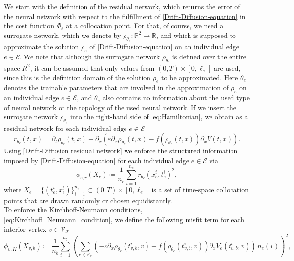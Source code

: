 We start with the definition of the residual network, which returns the error of the neural network with respect to the fulfillment of \cref{Drift-Diffusion-equation} in the cost function $\Phi_\theta$ at a collocation point. For that, of course, we need a surrogate network, which we denote by $\rho_{\theta_e} \colon \mathbb{R}^2 \to \mathbb{R}$, and which is supposed to approximate the solution $\rho_e$ of \cref{Drift-Diffusion-equation} on an individual edge $e \in \mathcal{E}$. We note that although the surrogate network $\rho_{\theta_e}$ is defined over the entire space $R^2$, it can be assumed that only values from $\left( 0, T \right) \times [0, \ell_e]$ are used, since this is the definition domain of the solution $\rho_e$ to be approximated. Here $\theta_e$ denotes the trainable parameters that are involved in the approximation of $\rho_e$ on an individual edge $e \in \mathcal{E}$, and $\theta_e$ also contains no information about the used type of neural network or the topology of the used neural network. If we insert the surrogate network $\rho_{\theta_e}$ into the right-hand side of \cref{eq:Hamiltonian}, we obtain as a residual network for each individual edge $e \in \mathcal{E}$
\begin{equation}
    \label{Drift-Diffusion residual network}
    r_{\theta_e} \left( t,x \right)=\partial_t \rho_{\theta_e} \left( t,x \right) - \partial_x   \left(  \varepsilon \partial_x  \rho_{\theta_e} \left( t,x \right) - f \left( \rho_{\theta_e} \left( t,x \right) \right) \partial_x V \left( t,x \right) \right).
\end{equation}
Using \cref{Drift-Diffusion residual network} we enforce the structured information imposed by \cref{Drift-Diffusion-equation} for each individual edge $e \in \mathcal{E}$ via
\begin{equation} 
    \label{misfit:residual}
    \phi_{e,r}  \left( X_e \right) \coloneqq \frac{1}{n_e} \sum_{i=1}^{n_e} r_{\theta_e}  \left( x_e^i, t_e^i \right)^2,
\end{equation} 
where $X_e = \{ \left( t_e^i, x_e^i \right)\}_{i=1}^{n_e} \subset \left( 0, T \right) \times [0, \ell_e]$ is a set of time-space collocation points that are drawn randomly or chosen equidistantly. \\
To enforce the Kirchhoff-Neumann conditions, \cref{eq:Kirchhoff_Neumann_condition}, we define the following misfit term for each interior vertex $v \in \mathcal{V}_\mathcal{K}$ 
\begin{equation} 
    \label{misfit:Kirchhoff}
    \phi_{v,K}  \left( X_{v,b} \right) \coloneqq \frac{1}{n_b} \sum_{i=1}^{n_b}  \left( \sum_{e \in \mathcal{E}_v}  \left( - \varepsilon \partial_x \rho_{\theta_e}  \left( t_{v,b}^i, v \right) + f \left( \rho_{\theta_e}  \left( t_{v,b}^i, v \right) \right) \partial_x V_e \left( t_{v,b}^i, v \right) \right) \, n_e  \left( v \right) \right)^2, 
\end{equation} 
